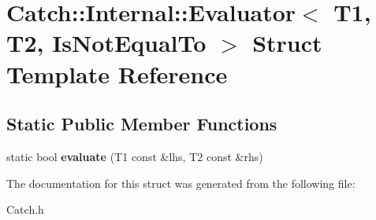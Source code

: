 \hypertarget{struct_catch_1_1_internal_1_1_evaluator_3_01_t1_00_01_t2_00_01_is_not_equal_to_01_4}{\section{Catch\-:\-:Internal\-:\-:Evaluator$<$ T1, T2, Is\-Not\-Equal\-To $>$ Struct Template Reference}
\label{struct_catch_1_1_internal_1_1_evaluator_3_01_t1_00_01_t2_00_01_is_not_equal_to_01_4}
}
\subsection*{Static Public Member Functions}
\begin{DoxyCompactItemize}
\item 
\hypertarget{struct_catch_1_1_internal_1_1_evaluator_3_01_t1_00_01_t2_00_01_is_not_equal_to_01_4_a956a12d0f4a7dceb5a1ce914421ff945}{static bool {\bfseries evaluate} (T1 const \&lhs, T2 const \&rhs)}\label{struct_catch_1_1_internal_1_1_evaluator_3_01_t1_00_01_t2_00_01_is_not_equal_to_01_4_a956a12d0f4a7dceb5a1ce914421ff945}

\end{DoxyCompactItemize}


The documentation for this struct was generated from the following file\-:\begin{DoxyCompactItemize}
\item 
Catch.\-h\end{DoxyCompactItemize}
